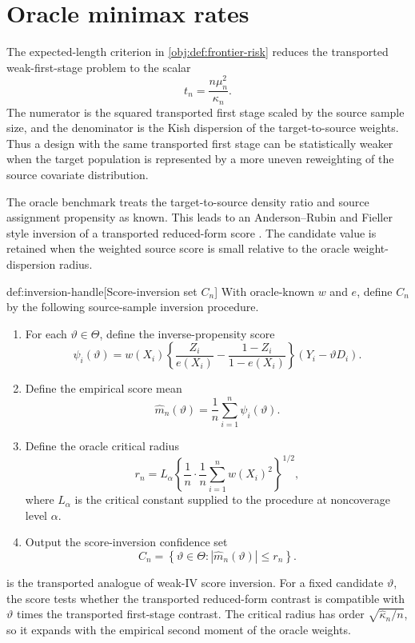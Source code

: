 \documentclass[11pt]{article}
\begin{document}
\section{Oracle minimax rates}

The expected-length criterion in \cref{obj:def:frontier-risk} reduces the transported weak-first-stage problem to the scalar
\[
t_n=\frac{n\mu_n^2}{\kappa_n}.
\]
The numerator is the squared transported first stage scaled by the source sample size, and the denominator is the Kish dispersion of the target-to-source weights. Thus a design with the same transported first stage can be statistically weaker when the target population is represented by a more uneven reweighting of the source covariate distribution.

The oracle benchmark treats the target-to-source density ratio and source assignment propensity as known. This leads to an Anderson--Rubin and Fieller style inversion of a transported reduced-form score \citep{AndersonRubin1949,Fieller1954}. The candidate value is retained when the weighted source score is small relative to the oracle weight-dispersion radius.

\begin{algorithmv}{def:inversion-handle}[Score-inversion set $C_n$]
With oracle-known \(w\) and \(e\), define \(C_n\) by the following source-sample inversion procedure.
\begin{enumerate}
\item For each \(\vartheta\in\Theta\), define the inverse-propensity score
\[
\psi_i(\vartheta)
=
w(X_i)\left\{\frac{Z_i}{e(X_i)}-\frac{1-Z_i}{1-e(X_i)}\right\}(Y_i-\vartheta D_i).
\]

\item Define the empirical score mean
\[
\widehat m_n(\vartheta)
=
\frac{1}{n}\sum_{i=1}^n \psi_i(\vartheta).
\]

\item Define the oracle critical radius
\[
r_n
=
L_\alpha
\left\{
\frac{1}{n}\cdot \frac{1}{n}\sum_{i=1}^n w(X_i)^2
\right\}^{1/2},
\]
where \(L_\alpha\) is the critical constant supplied to the procedure at noncoverage level \(\alpha\).

\item Output the score-inversion confidence set
\[
C_n
=
\left\{
\vartheta\in\Theta:
\left|\widehat m_n(\vartheta)\right|\le r_n
\right\}.
\]
\end{enumerate}
\end{algorithmv}

 is the transported analogue of weak-IV score inversion. For a fixed candidate \(\vartheta\), the score tests whether the transported reduced-form contrast is compatible with \(\vartheta\) times the transported first-stage contrast. The critical radius has order \(\sqrt{\widehat\kappa_n/n}\), so it expands with the empirical second moment of the oracle weights.
\end{document}

